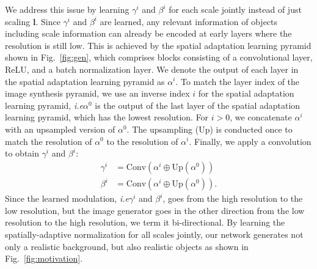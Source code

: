 \documentclass{bmvc2k}
\newcommand{\figref}[1]{Fig.~\ref{#1}}
\def\ie{\emph{i.e}\bmvaOneDot}
\begin{document}
We address this issue by learning $\gamma^i$ and $\beta^i$ for each scale jointly instead of just scaling $\mathbf{l}$. Since $\gamma^i$ and $\beta^i$ are learned, any relevant information of objects including scale information can already be encoded at early layers where the resolution is still low. This is achieved by the spatial adaptation learning pyramid shown in \figref{fig:gen}, which comprises blocks consisting of a convolutional layer, ReLU, and a batch normalization layer. We denote the output of each layer in the spatial adaptation learning pyramid as $\alpha^i$. To match the layer index of the image synthesis pyramid, we use an inverse index $i$ for the spatial adaptation learning pyramid, \ie $\alpha^0$ is the output of the last layer of the spatial adaptation learning pyramid,  which has the lowest resolution. For $i>0$, we concatenate $\alpha^i$ with an upsampled version of $\alpha^0$. The upsampling ($\mathrm{Up}$) is conducted once to match the resolution of $\alpha^0$ to the resolution of $\alpha^i$. Finally, we apply a convolution to obtain $\gamma^i$ and $\beta^i$:
\begin{equation}
\begin{split}
     \gamma^i &= \mathrm{Conv}(\alpha^i \oplus \mathrm{Up}(\alpha^0))\\
     \beta^i &= \mathrm{Conv}(\alpha^i \oplus \mathrm{Up}(\alpha^0)).   
\end{split}
\end{equation}
Since the learned modulation, \ie$\gamma^i$ and $\beta^i$, goes from the high resolution
to the low resolution, but the image generator goes in the
other direction from the low resolution to the high resolution,
we term it bi-directional. By learning the spatially-adaptive normalization for all scales jointly, our network generates not only a realistic background, but also realistic objects as shown in \figref{fig:motivation}.
\end{document}
